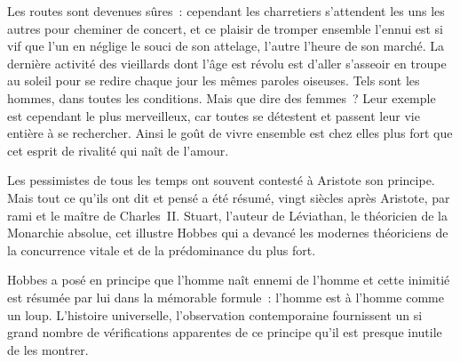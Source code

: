 \documentclass[french,twoside]{book} %
\newcommand{\astermono}{\medskip\centerline{\color{rubric}\large\selectfont{\syms ✻}}\medskip\par}%
\begin{document}
Les routes sont devenues sûres : cependant les charretiers s’attendent les uns les autres pour cheminer de concert, et ce plaisir de tromper ensemble l’ennui est si vif que l’un en néglige le souci de son attelage, l’autre l’heure de son marché. La dernière activité des vieillards dont l’âge est révolu est d’aller s’asseoir en troupe au soleil pour se redire chaque jour les mêmes paroles oiseuses. Tels sont les hommes, dans toutes les conditions. Mais que dire des femmes ? Leur exemple est cependant le plus merveilleux, car toutes se détestent et passent leur vie entière à se rechercher. Ainsi le goût de vivre ensemble est chez elles plus fort que cet esprit de rivalité qui naît de l’amour.\par

\astermono

\noindent Les pessimistes de tous les temps ont souvent contesté à Aristote son principe. Mais tout ce qu’ils ont dit et pensé a été résumé, vingt siècles après Aristote, par rami et le maître de Charles II. Stuart, l’auteur de Léviathan, le théoricien de la Monarchie absolue, cet illustre Hobbes qui a devancé les modernes théoriciens de la concurrence vitale et de la prédominance du plus fort.\par
Hobbes a posé en principe que l’homme naît ennemi de l’homme et cette inimitié est résumée par lui dans la mémorable formule : l’homme est à l’homme comme un loup. L’histoire universelle, l’observation contemporaine fournissent un si grand nombre de vérifications apparentes de ce principe qu’il est presque inutile de les montrer.\par

\astermono
\end{document}
